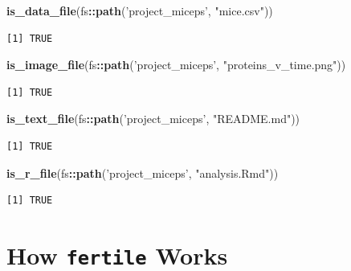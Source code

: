 \documentclass[12pt,twoside]{reedthesis}
\newenvironment{Shaded}{\begin{snugshade}}{\end{snugshade}}
\newcommand{\KeywordTok}[1]{\textcolor[rgb]{0.13,0.29,0.53}{\textbf{#1}}}
\newcommand{\StringTok}[1]{\textcolor[rgb]{0.31,0.60,0.02}{#1}}
\newcommand{\OperatorTok}[1]{\textcolor[rgb]{0.81,0.36,0.00}{\textbf{#1}}}
\newcommand{\NormalTok}[1]{#1}
\begin{document}
\footnotesize
\begin{Shaded}
\begin{Highlighting}[]
\KeywordTok{is_data_file}\NormalTok{(fs}\OperatorTok{::}\KeywordTok{path}\NormalTok{(}\StringTok{'project_miceps'}\NormalTok{, }\StringTok{"mice.csv"}\NormalTok{))}
\end{Highlighting}
\end{Shaded}
\begin{verbatim}
[1] TRUE
\end{verbatim}
\begin{Shaded}
\begin{Highlighting}[]
\KeywordTok{is_image_file}\NormalTok{(fs}\OperatorTok{::}\KeywordTok{path}\NormalTok{(}\StringTok{'project_miceps'}\NormalTok{, }\StringTok{"proteins_v_time.png"}\NormalTok{))}
\end{Highlighting}
\end{Shaded}
\begin{verbatim}
[1] TRUE
\end{verbatim}
\begin{Shaded}
\begin{Highlighting}[]
\KeywordTok{is_text_file}\NormalTok{(fs}\OperatorTok{::}\KeywordTok{path}\NormalTok{(}\StringTok{'project_miceps'}\NormalTok{, }\StringTok{"README.md"}\NormalTok{))}
\end{Highlighting}
\end{Shaded}
\begin{verbatim}
[1] TRUE
\end{verbatim}
\begin{Shaded}
\begin{Highlighting}[]
\KeywordTok{is_r_file}\NormalTok{(fs}\OperatorTok{::}\KeywordTok{path}\NormalTok{(}\StringTok{'project_miceps'}\NormalTok{, }\StringTok{"analysis.Rmd"}\NormalTok{))}
\end{Highlighting}
\end{Shaded}
\begin{verbatim}
[1] TRUE
\end{verbatim}
\normalsize

\section{\texorpdfstring{How \texttt{fertile}
Works}{How fertile Works}}\label{how-fertile-works}
\end{document}
